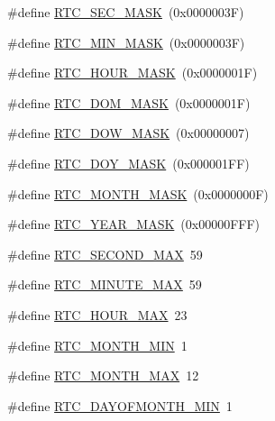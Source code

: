\begin{DoxyCompactItemize}
\item 
\#define \hyperlink{group___r_t_c__17_x_x__40_x_x_gabc478af38e7fa3018d8449f22c51d10e}{R\+T\+C\+\_\+\+S\+E\+C\+\_\+\+M\+A\+S\+K}~(0x0000003\+F)
\item 
\#define \hyperlink{group___r_t_c__17_x_x__40_x_x_ga9f3224adad8ed73109ee0309c3580998}{R\+T\+C\+\_\+\+M\+I\+N\+\_\+\+M\+A\+S\+K}~(0x0000003\+F)
\item 
\#define \hyperlink{group___r_t_c__17_x_x__40_x_x_ga3c6fd786e3cb5f56b71474fc2d26a8a4}{R\+T\+C\+\_\+\+H\+O\+U\+R\+\_\+\+M\+A\+S\+K}~(0x0000001\+F)
\item 
\#define \hyperlink{group___r_t_c__17_x_x__40_x_x_ga7c4ea655a8ccf43870c672c1058a133e}{R\+T\+C\+\_\+\+D\+O\+M\+\_\+\+M\+A\+S\+K}~(0x0000001\+F)
\item 
\#define \hyperlink{group___r_t_c__17_x_x__40_x_x_ga6564edf565a643214a54ffac364c69ca}{R\+T\+C\+\_\+\+D\+O\+W\+\_\+\+M\+A\+S\+K}~(0x00000007)
\item 
\#define \hyperlink{group___r_t_c__17_x_x__40_x_x_ga7c8c3332f827ea092523b75ef953bd8b}{R\+T\+C\+\_\+\+D\+O\+Y\+\_\+\+M\+A\+S\+K}~(0x000001\+F\+F)
\item 
\#define \hyperlink{group___r_t_c__17_x_x__40_x_x_ga491df15fba29dd3237f7bd59a9338050}{R\+T\+C\+\_\+\+M\+O\+N\+T\+H\+\_\+\+M\+A\+S\+K}~(0x0000000\+F)
\item 
\#define \hyperlink{group___r_t_c__17_x_x__40_x_x_ga35a455a48ccdb557b824e87701449c76}{R\+T\+C\+\_\+\+Y\+E\+A\+R\+\_\+\+M\+A\+S\+K}~(0x00000\+F\+F\+F)
\item 
\#define \hyperlink{group___r_t_c__17_x_x__40_x_x_ga60bbeee3abbb647a0daa7c2130965646}{R\+T\+C\+\_\+\+S\+E\+C\+O\+N\+D\+\_\+\+M\+A\+X}~59
\item 
\#define \hyperlink{group___r_t_c__17_x_x__40_x_x_gab55b557eeb5c66e94a2fda3638e3b7ee}{R\+T\+C\+\_\+\+M\+I\+N\+U\+T\+E\+\_\+\+M\+A\+X}~59
\item 
\#define \hyperlink{group___r_t_c__17_x_x__40_x_x_ga35630c42240ce2e8f74c38e1731d7e68}{R\+T\+C\+\_\+\+H\+O\+U\+R\+\_\+\+M\+A\+X}~23
\item 
\#define \hyperlink{group___r_t_c__17_x_x__40_x_x_ga5002ab062a5871b7ed73c7ff0cb00e6b}{R\+T\+C\+\_\+\+M\+O\+N\+T\+H\+\_\+\+M\+I\+N}~1
\item 
\#define \hyperlink{group___r_t_c__17_x_x__40_x_x_gacad40d1a94fd9b6884ec6160abb07674}{R\+T\+C\+\_\+\+M\+O\+N\+T\+H\+\_\+\+M\+A\+X}~12
\item 
\#define \hyperlink{group___r_t_c__17_x_x__40_x_x_gafbcf1009356ffdad8f11920167908213}{R\+T\+C\+\_\+\+D\+A\+Y\+O\+F\+M\+O\+N\+T\+H\+\_\+\+M\+I\+N}~1

\end{DoxyCompactItemize}
